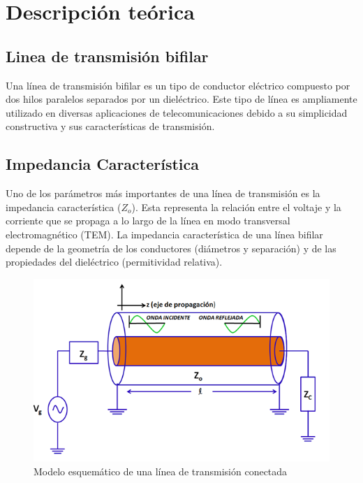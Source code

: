 \section{Descripción teórica}

\subsection{Linea de transmisión bifilar}
Una línea de transmisión bifilar es un tipo de conductor eléctrico compuesto por dos hilos paralelos separados por un dieléctrico. Este tipo de línea es ampliamente utilizado en diversas aplicaciones de telecomunicaciones debido a su simplicidad constructiva y sus características de transmisión.

\subsection{Impedancia Característica}

Uno de los parámetros más importantes de una línea de transmisión es la impedancia característica ($Z_o$). Esta representa la relación entre el voltaje y la corriente que se propaga a lo largo de la línea en modo transversal electromagnético (TEM). La impedancia característica de una línea bifilar depende de la geometría de los conductores (diámetros y separación) y de las propiedades del dieléctrico (permitividad relativa).
        \begin{center}
        \begin{figure}[H]
        \centering  
        \includegraphics[scale=0.7]{imagenes/Modelo esquemático de una línea de transmisión conectada.png}
        \caption{Modelo esquemático de una línea de transmisión conectada}
        \end{figure}
        \end{center}

